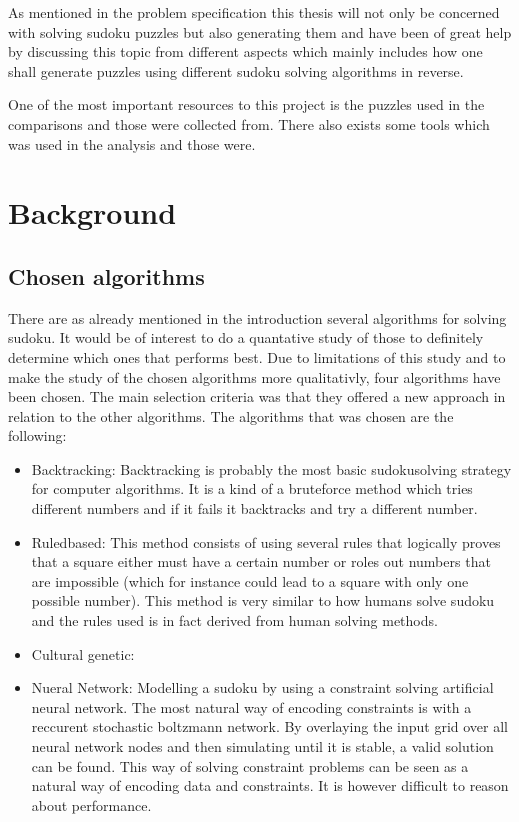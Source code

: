 \documentclass[a4paper,11pt]{kth-mag}
\begin{document}
As mentioned in the problem specification this thesis will not only be concerned with solving sudoku puzzles but also generating them and \cite{generation} have been of great help by discussing this topic from different aspects which mainly includes how one shall generate puzzles using different sudoku solving algorithms in reverse.

One of the most important resources to this project is the puzzles used in the comparisons and those were collected from. \cite{database} There also exists some tools which was used in the analysis and those were. \cite{13,14,15,16}

\chapter{Background}

\section{Chosen algorithms}
There are as already mentioned in the introduction several algorithms for solving sudoku.
It would be of interest to do a quantative study of those to definitely determine which ones that performs best.
Due to limitations of this study and to make the study of the chosen algorithms more qualitativly, four algorithms have been chosen.
The main selection criteria was that they offered a new approach in relation to the other algorithms.
The algorithms that was chosen are the following:
\begin{itemize}
    \item Backtracking: Backtracking is probably the most basic sudokusolving strategy for computer algorithms.
It is a kind of a bruteforce method which tries different numbers and if it fails it backtracks and try a different number.
    \item Ruledbased: This method consists of using several rules that logically proves that a square either must have a certain number or roles out numbers that are impossible (which for instance could lead to a square with only one possible number).
This method is very similar to how humans solve sudoku and the rules used is in fact derived from human solving methods.
    \item Cultural genetic: 
    \item Nueral Network: Modelling a sudoku by using a constraint solving artificial neural network.
The most natural way of encoding constraints is with a reccurent stochastic boltzmann network.
By overlaying the input grid over all neural network nodes and then simulating until it is stable, a valid solution can be found.
This way of solving constraint problems can be seen as a natural way of encoding data and constraints.
It is however difficult to reason about performance.
\end{itemize}
\end{document}
